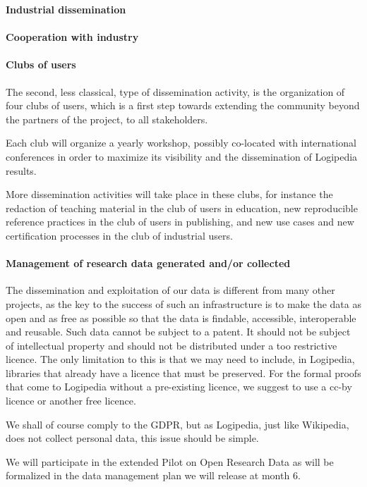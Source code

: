 {\bf Industrial dissemination}

\paragraph*{Cooperation with industry}


\paragraph*{Clubs of users}

The second, less classical, type of dissemination activity, is the
organization of four clubs of users, which is a first step towards
extending the community beyond the partners of
the project, to all stakeholders.

Each club will organize a yearly workshop, possibly co-located with
international conferences in order to maximize its visibility
and the dissemination of Logipedia results.

More dissemination activities will take place in these clubs,
for instance the redaction of teaching material in the club of users in
education, new reproducible reference practices in the club of users
in publishing, and new use cases and new certification processes in the
club of industrial users.

\paragraph*{Management of research data generated and/or collected}

The dissemination and exploitation of our data is different from many
other projects, as the key to the success of such an infrastructure is
to make the data as open and as free as possible so that the data is
findable, accessible, interoperable and reusable. Such data cannot be
subject to a patent. It should not be subject of intellectual property
and should not be distributed under a too restrictive licence. The only
limitation to this is that we may need to include, in Logipedia,
libraries that already have a licence that must be preserved.  For the
formal proofs that come to Logipedia without a pre-existing licence,
we suggest to use a cc-by licence or another free licence.

We shall of course comply to the GDPR, but as Logipedia, just like 
Wikipedia, does not collect personal data, this issue should be simple.

We will participate in the extended Pilot on Open Research Data as
will be formalized in the data management plan we will release at
month 6.

